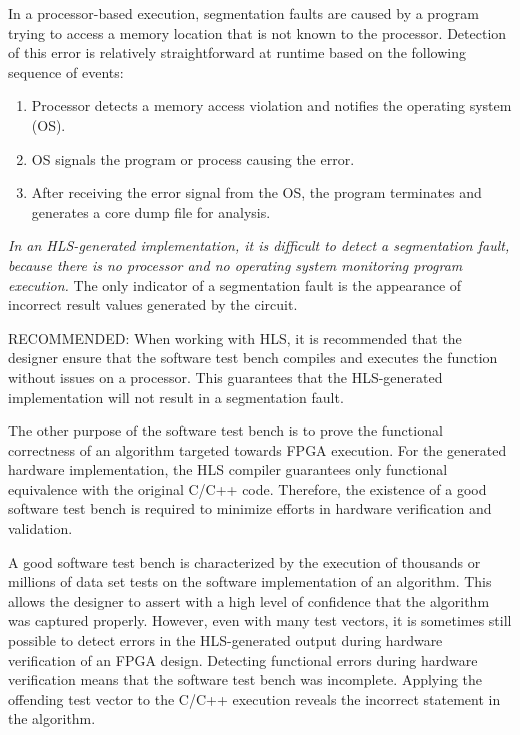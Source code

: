 In a processor-based execution, segmentation faults are caused by a program trying to access a memory location
that is not known to the processor. 
Detection of this error is relatively
straightforward at runtime based on the following sequence of events:
\begin{enumerate}
  \item Processor detects a memory access violation and notifies the operating system (OS).
  \item OS signals the program or process causing the error.
  \item After receiving the error signal from the OS, the program terminates and generates a core dump file for analysis.
\end{enumerate}

\textit{In an HLS-generated implementation, it is difficult to detect a segmentation fault, because
there is no processor and no operating system monitoring program execution.} The only
indicator of a segmentation fault is the appearance of incorrect result values generated by
the circuit. 


\begin{highlight}
  RECOMMENDED: When working with HLS, it is recommended that the designer ensure that the
  software test bench compiles and executes the function without issues on a processor. This guarantees
  that the HLS-generated implementation will not result in a segmentation fault.
\end{highlight}

The other purpose of the software test bench is to prove the functional correctness of an algorithm targeted towards FPGA execution. For the generated hardware implementation,
the HLS compiler guarantees only functional equivalence with the original C/C++ code. Therefore, the existence of a good software test bench is required to minimize efforts in
hardware verification and validation.

A good software test bench is characterized by the execution of thousands or millions of data set tests on the software implementation of an algorithm. This allows the designer to
assert with a high level of confidence that the algorithm was captured properly. However,
even with many test vectors, it is sometimes still possible to detect errors in the
HLS-generated output during hardware verification of an FPGA design. Detecting
functional errors during hardware verification means that the software test bench was
incomplete. Applying the offending test vector to the C/C++ execution reveals the incorrect
statement in the algorithm.

